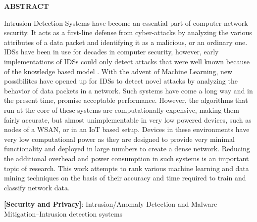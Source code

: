 \begin{center}
\Large{\textbf{ABSTRACT}}\\
\end{center}
Intrusion Detection Systems have become an essential part of computer network security. It acts as a first-line defense from cyber-attacks by analyzing the various attributes of a data packet and identifying it as a malicious, or an ordinary one. IDSs have been in use for decades in computer security, however, early implementations of IDSs could only detect attacks that were well known because of the knowledge based model \cite{ids_taxonomy}. With the advent of Machine Learning, new possibilites have opened up for IDSs to detect novel attacks by analyzing the behavior of data packets in a network. Such systems have come a long way and in the present time, promise acceptable performance. However, the algorithms that run at the core of these systems are computationally expensive, making them fairly accurate, but almost unimplementable in very low powered devices, such as nodes of a WSAN, or in an IoT based setup. Devices in these environments have very low computational power as they are designed to provide very minimal functionality and deployed in large numbers to create a dense network. Reducing the additional overhead and power consumption in such systems is an important topic of research. This work attempts to rank various machine learning and data mining techniques on the basis of their accuracy and time required to train and classify network data.

\par
\textbf{[Security and Privacy]}: Intrusion/Anomaly Detection and Malware Mitigation--Intrusion detection systems

